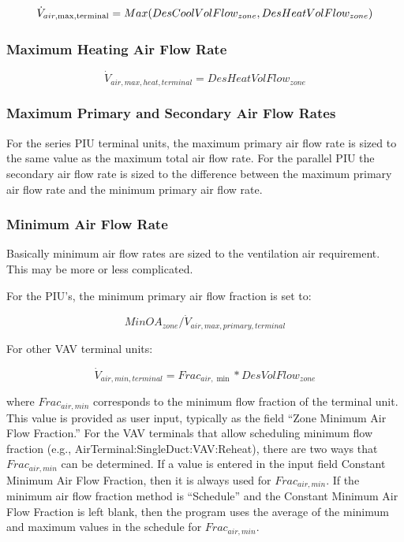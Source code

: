 \begin{equation}
{\dot V_{air,\max ,{\rm{terminal}}}} = Max(DesCoolVolFlow_{zone},DesHeatVolFlow_{zone})
\end{equation}

\subsubsection{Maximum Heating Air Flow Rate}\label{maximum-heating-air-flow-rate}

\begin{equation}
{\dot V_{air,max,heat,terminal}} = DesHeatVolFlow_{zone}
\end{equation}

\subsubsection{Maximum Primary and Secondary Air Flow Rates}\label{maximum-primary-and-secondary-air-flow-rates}

For the series PIU terminal units, the maximum primary air flow rate is sized to the same value as the maximum total air flow rate. For the parallel PIU the secondary air flow rate is sized to the difference between the maximum primary air flow rate and the minimum primary air flow rate.

\subsubsection{Minimum Air Flow Rate}\label{minimum-air-flow-rate}

Basically minimum air flow rates are sized to the ventilation air requirement. This may be more or less complicated.

For the PIU's, the minimum primary air flow fraction is set to:

\begin{equation}
{MinOA}_{zone} /{\dot V_{air,max,primary,terminal}}
\end{equation}

For other VAV terminal units:

\begin{equation}
{\dot V_{air,min,terminal}} = Fra{c_{air,\min }}*DesVolFlow_{zone}
\end{equation}

where \emph{\(Frac_{air,min}\)} corresponds to the minimum flow fraction of the terminal unit. This value is provided as user input, typically as the field ``Zone Minimum Air Flow Fraction.'' For the VAV terminals that allow scheduling minimum flow fraction (e.g., AirTerminal:SingleDuct:VAV:Reheat), there are two ways that \emph{\(Frac_{air,min}\)} can be determined. If a value is entered in the input field Constant Minimum Air Flow Fraction, then it is always used for \emph{\(Frac_{air,min}\)}. If the minimum air flow fraction method is ``Schedule'' and the Constant Minimum Air Flow Fraction is left blank, then the program uses the average of the minimum and maximum values in the schedule for \emph{\(Frac_{air,min}\)}.

